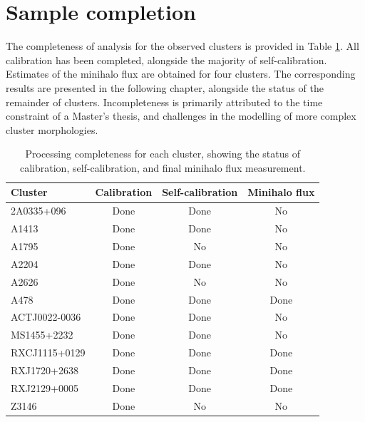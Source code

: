 \section{Sample completion}
The completeness of analysis for the observed clusters is provided in Table \ref{tab:completeness}. All calibration has been completed, alongside the majority of self-calibration. Estimates of the minihalo flux are obtained for four clusters. The corresponding results are presented in the following chapter, alongside the status of the remainder of clusters. Incompleteness is primarily attributed to the time constraint of a Master's thesis, and challenges in the modelling of more complex cluster morphologies.

\begin{table}
    \centering
    \setlength{\tabcolsep}{6pt}
    \begin{threeparttable}
        \begin{tabular}{lccc}
            \toprule
            Cluster & Calibration & Self-calibration & Minihalo flux \\
            \midrule
            2A0335+096      & Done & Done    & No \\
            A1413           & Done & Done    & No \\
            A1795           & Done & No      & No \\
            A2204           & Done & Done    & No \\
            A2626           & Done & No      & No \\
            A478            & Done & Done    & Done \\
            ACTJ0022-0036   & Done & Done    & No \\
            MS1455+2232     & Done & Done    & No \\
            RXCJ1115+0129   & Done & Done    & Done \\
            RXJ1720+2638    & Done & Done    & Done \\
            RXJ2129+0005    & Done & Done & Done \\
            Z3146           & Done & No & No \\
            \bottomrule
        \end{tabular}
        \caption{Processing completeness for each cluster, showing the status of calibration, self-calibration, and final minihalo flux measurement.}
        \label{tab:completeness}
    \end{threeparttable}
\end{table}
